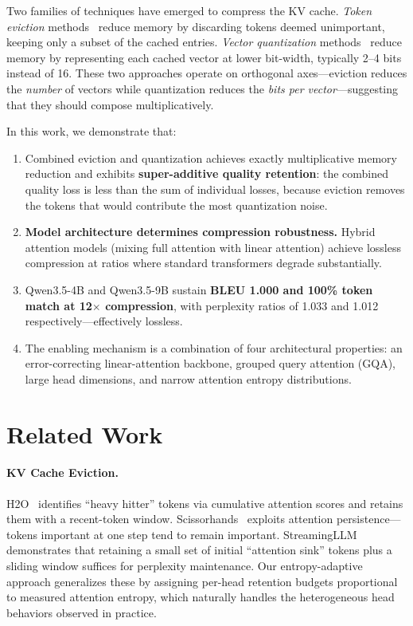 \documentclass[11pt]{article}
\begin{document}
Two families of techniques have emerged to compress the KV cache.  \emph{Token eviction} methods~\citep{zhang2024h2o,liu2024scissorhands,xiao2024efficient} reduce memory by discarding tokens deemed unimportant, keeping only a subset of the cached entries.  \emph{Vector quantization} methods~\citep{hooper2024kvquant,kang2024gear,liu2024kivi,duanmu2024turboquant} reduce memory by representing each cached vector at lower bit-width, typically 2--4 bits instead of 16.  These two approaches operate on orthogonal axes---eviction reduces the \emph{number} of vectors while quantization reduces the \emph{bits per vector}---suggesting that they should compose multiplicatively.

In this work, we demonstrate that:
\begin{enumerate}[leftmargin=*]
    \item Combined eviction and quantization achieves exactly multiplicative memory reduction and exhibits \textbf{super-additive quality retention}: the combined quality loss is less than the sum of individual losses, because eviction removes the tokens that would contribute the most quantization noise.
    \item \textbf{Model architecture determines compression robustness.}  Hybrid attention models (mixing full attention with linear attention) achieve lossless compression at ratios where standard transformers degrade substantially.
    \item Qwen3.5-4B and Qwen3.5-9B sustain \textbf{BLEU 1.000 and 100\% token match at 12$\times$ compression}, with perplexity ratios of 1.033 and 1.012 respectively---effectively lossless.
    \item The enabling mechanism is a combination of four architectural properties: an error-correcting linear-attention backbone, grouped query attention (GQA), large head dimensions, and narrow attention entropy distributions.
\end{enumerate}

\section{Related Work}
\label{sec:related}

\paragraph{KV Cache Eviction.}
H2O~\citep{zhang2024h2o} identifies ``heavy hitter'' tokens via cumulative attention scores and retains them with a recent-token window.  Scissorhands~\citep{liu2024scissorhands} exploits attention persistence---tokens important at one step tend to remain important.  StreamingLLM~\citep{xiao2024efficient} demonstrates that retaining a small set of initial ``attention sink'' tokens plus a sliding window suffices for perplexity maintenance.  Our entropy-adaptive approach generalizes these by assigning per-head retention budgets proportional to measured attention entropy, which naturally handles the heterogeneous head behaviors observed in practice.
\end{document}
